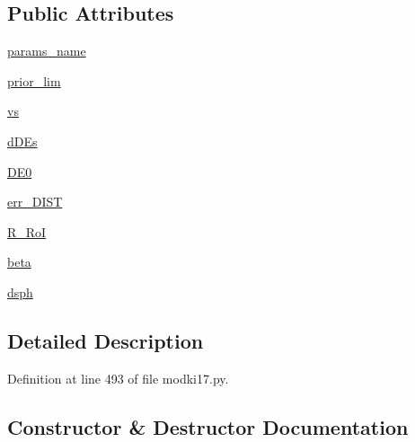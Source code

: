 \subsection*{Public Attributes}
\begin{DoxyCompactItemize}
\item 
\hyperlink{classmodki17_1_1modKI17__memonly_a7ee723c1fd5c5bf977caeaadd52d9e24}{params\+\_\+name}
\item 
\hyperlink{classmodki17_1_1modKI17__memonly_a1a9a34758068e1adc3da2f367ddf2350}{prior\+\_\+lim}
\item 
\hyperlink{classmodki17_1_1modKI17__memonly_a20e35678f46a3680074c9825fbee1827}{vs}
\item 
\hyperlink{classmodki17_1_1modKI17__memonly_aae460091f1bf62d4cf6bd2a4af2ff4dd}{d\+D\+Es}
\item 
\hyperlink{classmodki17_1_1modKI17__memonly_ad7dbff1472926d76e3e5231bf0115e55}{D\+E0}
\item 
\hyperlink{classmodki17_1_1modKI17__memonly_ab976f4443d74cc55625b78a0e5f6b9b6}{err\+\_\+\+D\+I\+ST}
\item 
\hyperlink{classmodki17_1_1modKI17__memonly_ae38f2f8fc61b3c67e115804eae04a1dc}{R\+\_\+\+RoI}
\item 
\hyperlink{classmodki17_1_1modKI17__memonly_a193da8b47599eb4a1c60ae080d7475c1}{beta}
\item 
\hyperlink{classmodki17_1_1modKI17__memonly_af18e7534e139aac140481e4971e85056}{dsph}
\end{DoxyCompactItemize}


\subsection{Detailed Description}


Definition at line 493 of file modki17.\+py.



\subsection{Constructor \& Destructor Documentation}
\mbox{\label{classmodki17_1_1modKI17__memonly_a130f863b48dea1c6555c206233f6ba40}} 
